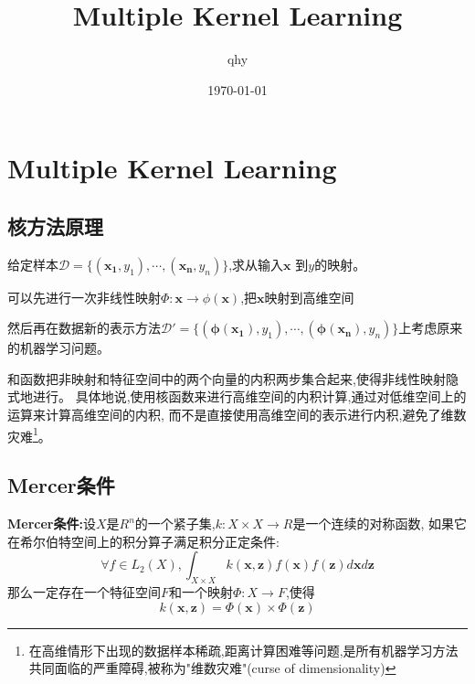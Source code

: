 \documentclass[UTF8,a4paper]{ctexart}
\author{qhy}
\date{\today}
\title{Multiple Kernel Learning}
\begin{document}
    \maketitle
    \tableofcontents
    \newpage
    \section{Multiple Kernel Learning}
        \subsection{核方法原理}
        给定样本$\mathcal{D} = \{(\bm{x_1} , y_1),\cdots,(\bm{x_n} , y_n)\}$,求从输入$\bm x$ 到$y$的映射。

        可以先进行一次非线性映射$\Phi:\bm x\to\phi(\bm x)$,把$\bm x$映射到高维空间

        然后再在数据新的表示方法$\mathcal{D'} = \{(\bm{\phi(x_1)} , y_1),\cdots,(\bm{\phi(x_n)} , y_n)\}$上考虑原来的机器学习问题。

        和函数把非映射和特征空间中的两个向量的内积两步集合起来,使得非线性映射隐式地进行。
        具体地说,使用核函数来进行高维空间的内积计算,通过对低维空间上的运算来计算高维空间的内积,
        而不是直接使用高维空间的表示进行内积,避免了维数灾难\footnote{在高维情形下出现的数据样本稀疏,距离计算困难等问题,是所有机器学习方法共同面临的严重障碍,被称为"维数灾难"(curse of dimensionality)}。

        \subsection{Mercer条件}
        \textbf{Mercer条件:}设$X$是$R^n$的一个紧子集,$k:X\times X \to R$是一个连续的对称函数,
        如果它在希尔伯特空间上的积分算子满足积分正定条件:
        \begin{equation}
            \forall f \in L_2(X) , \int_{X\times X} k(\bm x , \bm z)f(\bm x)f(\bm z)d\bm x d\bm z
        \end{equation}
        那么一定存在一个特征空间$F$和一个映射$\Phi:X\to F$,使得
        \begin{equation}
            k(\bm x, \bm z) = \Phi(\bm x)\times \Phi(\bm z)
        \end{equation}
\end{document}
